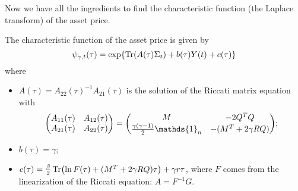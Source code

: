 Now we have all the ingredients to find the characteristic function (the Laplace transform) of the asset price.
\begin{proposition}
    The characteristic function of the asset price is given by
    \begin{equation}\label{characteristic-func}
        \psi_{\gamma,t}(\tau) = \exp{\Tr(A(\tau)\Sigma_t)+b(\tau)Y(t)+c(\tau)}
    \end{equation}
    where
    \begin{itemize}
        \item $A(\tau) = A_{22}(\tau)^{-1}A_{21}(\tau)$ is the solution of the Riccati matrix equation with
        \begin{equation}
            \mqty(A_{11}(\tau) & A_{12}(\tau) \\ A_{21}(\tau) & A_{22}(\tau)) = \mqty(M & -2Q^TQ \\ \tfrac{\gamma(\gamma -1)}{2}\mathds{1}_n & -(M^T+2\gamma RQ));
        \end{equation}
        \item $b(\tau) = \gamma$;
        \item $c(\tau) = \tfrac{\beta}{2}\Tr(\ln F(\tau)+(M^T+2\gamma RQ)\tau)+\gamma r\tau$, where $F$ comes from the linearization of the Riccati equation: $A=F^{-1}G$.
    \end{itemize}
\end{proposition}
